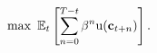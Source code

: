   \begin{equation}\label{eq:MaxProb}
    \max~{{\mathbb{E}}}_{t}\left[\sum_{n=0}^{T-t}{\beta}^{n} \mathrm{u}({\mathbf{c}}_{t+n})\right].
  \end{equation}
